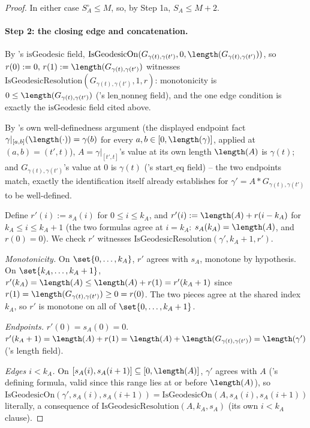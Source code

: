 \begin{proof}
  In either case $S_A^{\circ}\le M$, so, by Step 1a, $S_A \le M+2$.

  \paragraph{Step 2: the closing edge and concatenation.} By 's
  $\mathrm{isGeodesic}$ field, $\mathrm{IsGeodesicOn}(G_{\gamma(t),\gamma(t')},0,
  \length(G_{\gamma(t),\gamma(t')}))$, so $r(0):=0,\,r(1):=\length(G_{\gamma(t),\gamma(t')})$
  witnesses $\mathrm{IsGeodesicResolution}(G_{\gamma(t),\gamma(t')},1,r)$: monotonicity is
  $0\le\length(G_{\gamma(t),\gamma(t')})$ ('s $\mathrm{len\_nonneg}$ field), and the
  one edge condition is exactly the $\mathrm{isGeodesic}$ field cited above.

  By 's own well-definedness argument (the displayed endpoint fact
  $\gamma|_{[a,b]}(\length(\cdot))=\gamma(b)$ for every $a,b\in[0,\length(\gamma)]$, applied at
  $(a,b)=(t',t)$), $A=\gamma|_{[t',t]}$'s value at its own length $\length(A)$ is $\gamma(t)$; and
  $G_{\gamma(t),\gamma(t')}$'s value at $0$ is $\gamma(t)$ ('s
  $\mathrm{start\_eq}$ field) -- the two endpoints match, exactly the identification
   itself already establishes for $\gamma' = A * G_{\gamma(t),\gamma(t')}$ to be
  well-defined.

  Define $r'(i):=s_A(i)$ for $0\le i\le k_A$, and $r'(i):=\length(A)+r(i-k_A)$ for $k_A\le i\le
  k_A+1$ (the two formulas agree at $i=k_A$: $s_A(k_A)=\length(A)$, and $r(0)=0$). We check $r'$
  witnesses $\mathrm{IsGeodesicResolution}(\gamma',k_A+1,r')$.

  \emph{Monotonicity.} On $\set{0,\dots,k_A}$, $r'$ agrees with $s_A$, monotone by hypothesis. On
  $\set{k_A,\dots,k_A+1}$, $r'(k_A)=\length(A)\le\length(A)+r(1)=r'(k_A+1)$ since
  $r(1)=\length(G_{\gamma(t),\gamma(t')})\ge0=r(0)$. The two pieces agree at the shared index
  $k_A$, so $r'$ is monotone on all of $\set{0,\dots,k_A+1}$.

  \emph{Endpoints.} $r'(0)=s_A(0)=0$. $r'(k_A+1) = \length(A)+r(1) =
  \length(A)+\length(G_{\gamma(t),\gamma(t')}) = \length(\gamma')$ ('s length
  field).

  \emph{Edges $i<k_A$.} On $[s_A(i),s_A(i+1)] \subseteq [0,\length(A)]$, $\gamma'$ agrees with $A$
  ('s defining formula, valid since this range lies at or before
  $\length(A)$), so $\mathrm{IsGeodesicOn}(\gamma',s_A(i),s_A(i+1)) =
  \mathrm{IsGeodesicOn}(A,s_A(i),s_A(i+1))$ literally, a consequence of
  $\mathrm{IsGeodesicResolution}(A,k_A,s_A)$ (its own $i<k_A$ clause).


\end{proof}
